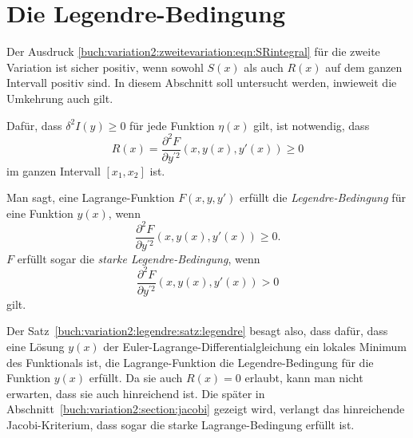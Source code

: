 %
%
%
\section{Die Legendre-Bedingung
\label{buch:variation2:section:legendre}}
Der Ausdruck \eqref{buch:variation2:zweitevariation:eqn:SRintegral}
für die zweite Variation ist sicher positiv, wenn sowohl $S(x)$
als auch $R(x)$ auf dem ganzen Intervall positiv sind.
In diesem Abschnitt soll untersucht werden, inwieweit die
Umkehrung auch gilt.

\begin{satz}[Legendre]
\label{buch:variation2:legendre:satz:legendre}
Dafür, dass $\delta^2I(y)\ge 0$ für jede Funktion $\eta(x)$ gilt, ist
notwendig, dass
\[
R(x)
=
\frac{\partial^2F}{\partial y^{\prime 2}}(x,y(x),y'(x))
\ge
0
\]
im ganzen Intervall $[x_1,x_2]$ ist.
\end{satz}

\begin{definition}
Man sagt, eine Lagrange-Funktion $F(x,y,y')$ erfüllt die
{\em Legendre-Bedingung}
%
für eine Funktion $y(x)$, wenn 
\[
\frac{\partial^2 F}{\partial y^{\prime 2}}(x,y(x),y'(x)) \ge 0.
\]
$F$ erfüllt sogar die {\em starke Legendre-Bedingung}, wenn
\[
\frac{\partial^2 F}{\partial y^{\prime 2}}(x,y(x),y'(x)) > 0
\]
gilt.
\end{definition}

Der Satz~\ref{buch:variation2:legendre:satz:legendre} besagt also,
dass dafür, dass eine Lösung $y(x)$ der
Euler-Lagrange-Diffe\-ren\-tial\-gleichung
ein lokales Minimum des Funktionals ist, die Lagrange-Funktion
die Legendre-Bedingung für die Funktion $y(x)$ erfüllt.
Da sie auch $R(x)=0$ erlaubt, kann man nicht erwarten, dass sie auch
hinreichend ist.
Die später in Abschnitt~\ref{buch:variation2:section:jacobi} gezeigt wird,
verlangt das hinreichende Jacobi-Kriterium, dass sogar die starke
Lagrange-Bedingung erfüllt ist.

